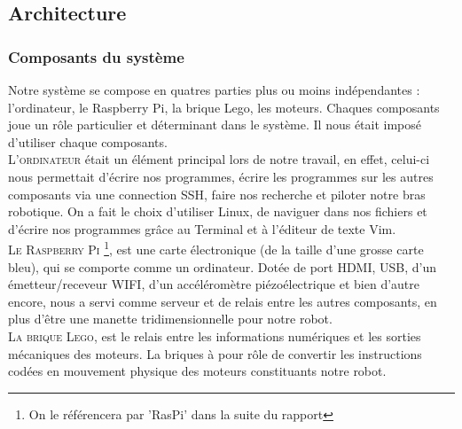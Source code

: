\documentclass[twoside,twocolumn, 16pt]{article}
\begin{document}
\subsection{Architecture}
\subsubsection{Composants du système}
Notre système se compose en quatres parties plus ou moins indépendantes : l’ordinateur, le Raspberry Pi, la brique Lego, les moteurs. Chaques composants joue un rôle particulier et déterminant dans le système. Il nous était imposé d’utiliser chaque composants. \\
\indent \textsc{L'ordinateur} était un élément principal lors de notre travail, en effet, celui-ci nous permettait d’écrire nos programmes, écrire les programmes sur les autres composants via une connection SSH, faire nos recherche et piloter notre bras robotique. On a fait le choix d’utiliser Linux, de naviguer dans nos fichiers et d’écrire nos programmes grâce au Terminal et à l’éditeur de texte Vim. \\
\indent \textsc{Le Raspberry Pi} \footnote{On le référencera par 'RasPi' dans la suite du rapport}, est une carte électronique (de la taille d’une grosse carte bleu), qui se comporte comme un ordinateur. Dotée de port HDMI, USB, d’un émetteur/receveur WIFI, d’un accéléromètre piézoélectrique et bien d’autre encore, nous a servi comme serveur et de relais entre les autres composants, en plus d’être une manette tridimensionnelle pour notre robot. \\ 
\indent \textsc{La brique Lego}, est le relais entre les informations numériques et les sorties mécaniques des moteurs. La briques à pour rôle de convertir les instructions codées en mouvement physique des moteurs constituants notre robot.
\vspace{-1cm}
\end{document}
